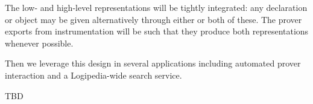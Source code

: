 \begin{workpackage}[id=structuring,wphases=0-48,type=RTD,
  short=Structured Theories and Metadata,%
  title=Structured Theories and Metadata,
  lead=FAU,
  BolRM=18,
  FAURM=48,
  SacRM=48]
\begin{wpdescription}
The low- and high-level representations will be tightly integrated: any declaration or object may be given alternatively through either or both of these.
The prover exports from instrumentation will be such that they produce both representations whenever possible.

Then we leverage this design in several applications including automated prover interaction and a Logipedia-wide search service.
\end{wpdescription}

\begin{tasklist}
\begin{task}[id=tbd,title=TBD]
\end{task}
\end{tasklist}

\begin{wpdelivs}
  \begin{wpdeliv}[due=3,miles=startup,id=requirements,dissem=PU,nature=DEM,lead=INR]
      {TBD}
\end{wpdeliv}
\end{wpdelivs}



\end{workpackage}
